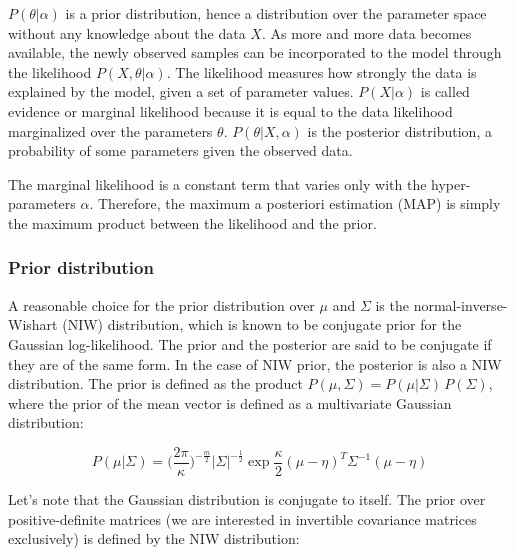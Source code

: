             $P(\theta \vert \alpha)$ is a prior distribution, hence a distribution over the parameter space without
            any knowledge about the data $X$. As more and more data becomes available, the newly observed samples can be
            incorporated to the model through the likelihood $P(X, \theta \vert \alpha)$. The likelihood measures how strongly
            the data is explained by the model, given a set of parameter values. $P(X \vert \alpha)$ is called evidence or
            marginal likelihood because it is equal to the data likelihood marginalized over the parameters $\theta$.
            $P(\theta \vert X, \alpha)$ is the posterior distribution, a probability of some parameters given
            the observed data.

            The marginal likelihood is a constant term that varies only with the hyper-parameters $\alpha$. Therefore, the maximum
            a posteriori estimation (MAP) is simply the maximum product between the likelihood and the prior.

        \subsubsection{Prior distribution}

            A reasonable choice for the prior distribution over $\mu$ and $\Sigma$ is the normal-inverse-Wishart (NIW)
            distribution, which is known to be conjugate prior for the Gaussian log-likelihood.
            The prior and the posterior are said to be conjugate if they are of the same form. In the case of NIW prior,
            the posterior is also a NIW distribution. The prior is defined as the product
            $P(\mu, \Sigma) = P(\mu \vert \Sigma)\,P(\Sigma)$, where the prior of the mean vector is defined as a multivariate
            Gaussian distribution:

            \begin{equation}  %
                P(\mu \vert \Sigma) = \Big(\frac{2 \pi}{\kappa}\Big)^{-\frac{m}{2}} \vert\Sigma\vert^{-\frac{1}{2}}
                \exp{\frac{\kappa}{2} (\mu - \eta)^T \Sigma^{-1} (\mu - \eta)}
            \end{equation}

            Let's note that the Gaussian distribution is conjugate to itself. The prior over positive-definite matrices
            (we are interested in invertible covariance matrices exclusively) is defined by the NIW distribution:

